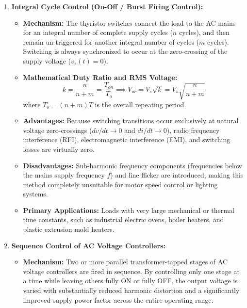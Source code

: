 \documentclass[11pt,a4paper]{article}
\begin{document}
\begin{enumerate}[leftmargin=*]
  \item \textbf{Integral Cycle Control (On-Off / Burst Firing Control):}
  \begin{itemize}[leftmargin=*]
    \item \textbf{Mechanism:} The thyristor switches connect the load to the AC mains for an integral number of complete supply cycles ($n$ cycles), and then remain un-triggered for another integral number of cycles ($m$ cycles). Switching is always synchronized to occur at the zero-crossing of the supply voltage ($v_s(t) = 0$).
    \item \textbf{Mathematical Duty Ratio and RMS Voltage:}
    \begin{equation}
    k = \frac{n}{n + m} = \frac{T_{on}}{T_o} \implies V_{or} = V_s \sqrt{k} = V_s \sqrt{\frac{n}{n + m}}
    \end{equation}
    where $T_o = (n + m)T$ is the overall repeating period.
    \item \textbf{Advantages:} Because switching transitions occur exclusively at natural voltage zero-crossings ($dv/dt \to 0$ and $di/dt \to 0$), radio frequency interference (RFI), electromagnetic interference (EMI), and switching losses are virtually zero.
    \item \textbf{Disadvantages:} Sub-harmonic frequency components (frequencies below the mains supply frequency $f$) and line flicker are introduced, making this method completely unsuitable for motor speed control or lighting systems.
    \item \textbf{Primary Applications:} Loads with very large mechanical or thermal time constants, such as industrial electric ovens, boiler heaters, and plastic extrusion mold heaters.
  \end{itemize}

  \item \textbf{Sequence Control of AC Voltage Controllers:}
  \begin{itemize}[leftmargin=*]
    \item \textbf{Mechanism:} Two or more parallel transformer-tapped stages of AC voltage controllers are fired in sequence. By controlling only one stage at a time while leaving others fully ON or fully OFF, the output voltage is varied with substantially reduced harmonic distortion and a significantly improved supply power factor across the entire operating range.
  \end{itemize}
\end{enumerate}
\end{document}
